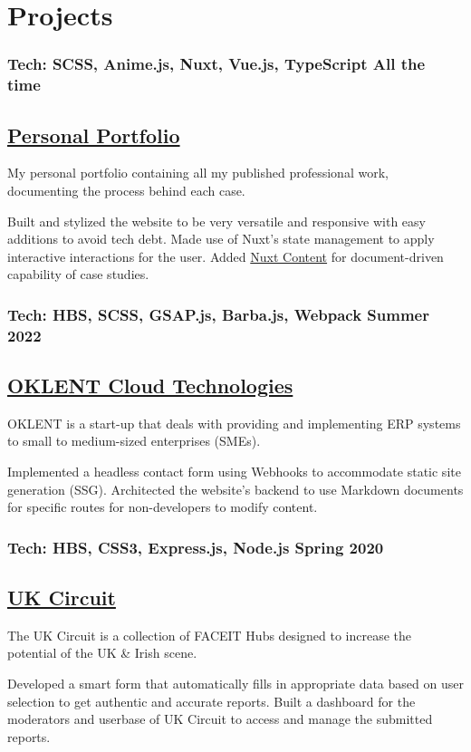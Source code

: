 \section*{Projects}
%
%
%
\subsubsection*{
  Tech: SCSS, Anime.js, Nuxt, Vue.js, TypeScript
  \hspace*{\fill}
  All the time
}
\subsection*{
  \href{https://bumbleboss.xyz/}{Personal Portfolio}
}
My personal portfolio containing all my published professional work, documenting the process behind each case.
\smallskip
\begin{tasks}
  \task Built and stylized the website to be very versatile and responsive with easy additions to avoid tech debt.
  \task Made use of Nuxt's state management to apply interactive interactions for the user.
  \task Added \href{https://content.nuxtjs.org/}{Nuxt Content} for document-driven capability of case studies.
\end{tasks}
%
%
\medskip
\subsubsection*{
  Tech: HBS, SCSS, GSAP.js, Barba.js, Webpack
  \hspace*{\fill}
  Summer 2022
}
\subsection*{
  \href{https://oklent.com/}{OKLENT Cloud Technologies}
}
OKLENT is a start-up that deals with providing and implementing ERP systems to small to medium-sized enterprises (SMEs).\smallskip
\begin{tasks}
  \task Implemented a headless contact form using Webhooks to accommodate static site generation (SSG).
  \task Architected the website’s backend to use Markdown documents for specific routes for non-developers to modify content.
\end{tasks}
%
%
\medskip
\subsubsection*{
  Tech: HBS, CSS3, Express.js, Node.js
  \hspace*{\fill}
  Spring 2020
}
\subsection*{
  \href{https://bumbleboss.xyz/w/uk-circuit}{UK Circuit}
}
The UK Circuit is a collection of FACEIT Hubs designed to increase the potential of the UK \& Irish scene.
\begin{tasks}
  \task Developed a smart form that automatically fills in appropriate data based on user selection to get authentic and accurate reports.
  \task Built a dashboard for the moderators and userbase of UK Circuit to access and manage the submitted reports.
\end{tasks}
%
%
\medskip
